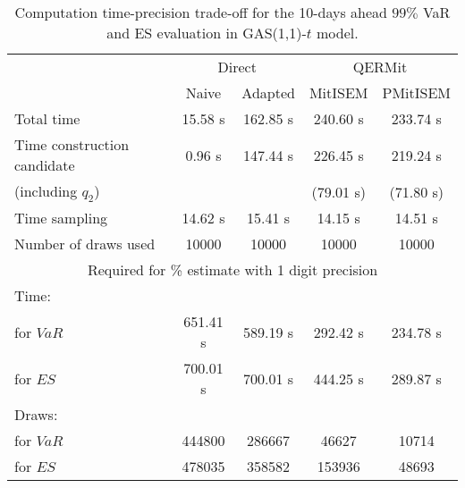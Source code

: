 { \renewcommand{\arraystretch}{1.3} 
\begin{table}[h] 
\centering 
\caption{Computation time-precision trade-off for the 10-days ahead  $99\%$ VaR and ES evaluation in GAS(1,1)-$t$ model.} 
\label{tab:time_precision_t_gas} 
\begin{tabular}{lcccc}  
  & \multicolumn{2}{c}{Direct} & \multicolumn{2}{c}{QERMit}  \\ \cline{2-5} 
  & Naive & Adapted & MitISEM & PMitISEM  \\ \hline 
Total time & 15.58 s & 162.85 s & 240.60 s & 233.74 s \\ 
Time construction candidate & 0.96 s & 147.44 s & 226.45 s & 219.24 s \\ 
 (including $q_{2}$) &   &  & (79.01 s) & (71.80 s) \\ 
Time sampling & 14.62 s & 15.41 s & 14.15 s & 14.51 s  \\  
Number of draws used & 10000 & 10000 & 10000 & 10000 \\ \hline 
\multicolumn{5}{c}{Required for \% estimate with 1 digit precision} \\ \hline 
Time: &  &  &   &  \\ 
\hspace{1cm} for $VaR$ & 651.41 s & 589.19 s & 292.42 s & 234.78 s \\ 
\hspace{1cm} for $ES$ & 700.01 s & 700.01 s & 444.25 s & 289.87 s \\ 
Draws: &  &  &   &  \\ 
\hspace{1cm} for $VaR$ & 444800 & 286667  &  46627  &  10714  \\ 
\hspace{1cm} for $ES$ & 478035 & 358582  & 153936   &  48693  \\ 
\hline 
\end{tabular} 
\end{table} 
} 
